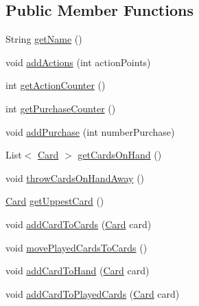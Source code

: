 \subsection*{\-Public \-Member \-Functions}
\begin{DoxyCompactItemize}
\item 
\-String \hyperlink{interfacedominion_1_1model_1_1Player_abe7318f98aa380aa223ff4e89d52a083}{get\-Name} ()
\item 
void \hyperlink{interfacedominion_1_1model_1_1Player_a82349da9ab8e0a25b35bdb331bbe572f}{add\-Actions} (int action\-Points)
\item 
int \hyperlink{interfacedominion_1_1model_1_1Player_abf2fcead53204e67de449987700478fd}{get\-Action\-Counter} ()
\item 
int \hyperlink{interfacedominion_1_1model_1_1Player_a1e6e9fbcd45aae1db183444f5d62bde8}{get\-Purchase\-Counter} ()
\item 
void \hyperlink{interfacedominion_1_1model_1_1Player_af01fdbc3e5cbb962b01abf1e04550770}{add\-Purchase} (int number\-Purchase)
\item 
\-List$<$ \hyperlink{interfacedominion_1_1model_1_1cards_1_1Card}{\-Card} $>$ \hyperlink{interfacedominion_1_1model_1_1Player_aa52354950cfd3a2c8661db77930dc714}{get\-Cards\-On\-Hand} ()
\item 
void \hyperlink{interfacedominion_1_1model_1_1Player_ad3742952187ffc677d85c70812598cef}{throw\-Cards\-On\-Hand\-Away} ()
\item 
\hyperlink{interfacedominion_1_1model_1_1cards_1_1Card}{\-Card} \hyperlink{interfacedominion_1_1model_1_1Player_a049bd1e65ec5d2fb3fb4d773000ab8c2}{get\-Uppest\-Card} ()
\item 
void \hyperlink{interfacedominion_1_1model_1_1Player_a2123620ca336d06a975a6c32edb1fc21}{add\-Card\-To\-Cards} (\hyperlink{interfacedominion_1_1model_1_1cards_1_1Card}{\-Card} card)
\item 
void \hyperlink{interfacedominion_1_1model_1_1Player_a564318ab4c9313d4662b174cb58df5a8}{move\-Played\-Cards\-To\-Cards} ()
\item 
void \hyperlink{interfacedominion_1_1model_1_1Player_adfabfa09d6695003a446f4668d42088a}{add\-Card\-To\-Hand} (\hyperlink{interfacedominion_1_1model_1_1cards_1_1Card}{\-Card} card)
\item 
void \hyperlink{interfacedominion_1_1model_1_1Player_a864f7fa0a08f02d5bff3108230a11f88}{add\-Card\-To\-Played\-Cards} (\hyperlink{interfacedominion_1_1model_1_1cards_1_1Card}{\-Card} card)
\item 

\end{DoxyCompactItemize}
